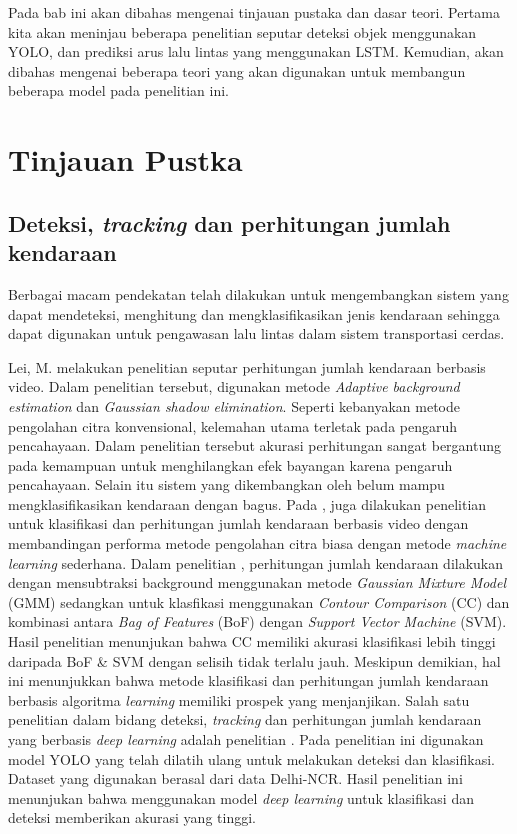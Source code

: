 \documentclass[../thesis.tex]{subfiles}
\begin{document}
   

Pada bab ini akan dibahas mengenai tinjauan pustaka dan dasar teori. Pertama kita akan meninjau beberapa penelitian seputar deteksi objek menggunakan YOLO, dan prediksi arus lalu lintas yang menggunakan LSTM.
Kemudian, akan dibahas mengenai beberapa teori yang akan digunakan untuk membangun beberapa model pada penelitian ini.

\section{Tinjauan Pustka}
\subsection{Deteksi, \textit{tracking} dan perhitungan jumlah kendaraan}
Berbagai macam pendekatan telah dilakukan untuk mengembangkan sistem yang dapat mendeteksi, menghitung dan mengklasifikasikan jenis kendaraan sehingga dapat digunakan untuk pengawasan lalu lintas dalam sistem transportasi cerdas.

Lei, M. melakukan penelitian seputar perhitungan jumlah kendaraan berbasis video. Dalam penelitian tersebut, digunakan metode \textit{Adaptive background estimation} dan \textit{Gaussian shadow elimination}. Seperti kebanyakan metode pengolahan citra konvensional, kelemahan utama terletak pada pengaruh pencahayaan. Dalam penelitian tersebut akurasi perhitungan
sangat bergantung pada kemampuan untuk menghilangkan efek bayangan karena pengaruh pencahayaan. Selain itu sistem yang dikembangkan oleh \cite{Lei2018VehicleCounting} belum mampu mengklasifikasikan kendaraan dengan bagus.
Pada \cite{Sheeraz2018VehicleDetection}, juga dilakukan penelitian untuk klasifikasi dan perhitungan jumlah kendaraan berbasis video dengan membandingan performa metode pengolahan citra biasa dengan metode \textit{machine learning} sederhana. Dalam penelitian \cite{Sheeraz2018VehicleDetection}, perhitungan jumlah kendaraan dilakukan dengan mensubtraksi background menggunakan metode \textit{Gaussian Mixture Model} (GMM) sedangkan untuk klasfikasi menggunakan \textit{Contour Comparison} (CC) dan kombinasi antara \textit{Bag of Features}
(BoF) dengan \textit{Support Vector Machine} (SVM). Hasil penelitian menunjukan bahwa CC memiliki akurasi klasifikasi lebih tinggi daripada BoF \& SVM dengan selisih tidak terlalu jauh. 
Meskipun demikian, hal ini menunjukkan bahwa metode klasifikasi dan perhitungan jumlah kendaraan berbasis algoritma \textit{learning} memiliki prospek yang menjanjikan.
Salah satu penelitian dalam bidang deteksi, \textit{tracking} dan perhitungan jumlah kendaraan yang berbasis \textit{deep learning} adalah penelitian \cite{Chaucan2019CNN}. Pada penelitian ini digunakan model YOLO yang telah dilatih ulang untuk melakukan deteksi dan klasifikasi. Dataset yang digunakan berasal dari data Delhi-NCR. Hasil penelitian ini menunjukan bahwa menggunakan model \textit{deep learning} untuk klasifikasi dan deteksi memberikan akurasi yang tinggi.  
\end{document}
